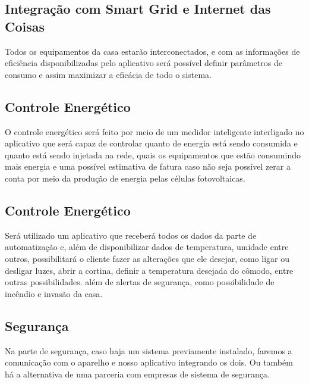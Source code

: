  	        \subsection{Integração com Smart Grid e Internet das Coisas}
 	            \par Todos os equipamentos da casa estarão interconectados, e com as informações de eficiência disponibilizadas pelo aplicativo será possível definir parâmetros de  consumo e assim maximizar a eficácia de todo o sistema.
 	            
 	        \subsection{Controle Energético}
	            \par O controle energético será feito por meio de um medidor inteligente interligado  no aplicativo que será capaz de controlar quanto de energia está sendo consumida e quanto está sendo injetada na rede, quais os equipamentos que estão consumindo mais energia e uma possível estimativa de fatura caso não seja possível zerar a conta por meio da produção de energia pelas células fotovoltaicas. \cite{solarvolt}
	            
	       \subsection{Controle Energético}
	            \par Será utilizado um aplicativo que receberá todos os dados da parte de automatização e, além de disponibilizar dados de temperatura, umidade entre outros, possibilitará o cliente fazer as alterações que ele desejar, como ligar ou desligar luzes, abrir a cortina, definir a temperatura desejada do cômodo, entre outras possibilidades. além de alertas de segurança, como possibilidade de incêndio e invasão da casa.  
	       
	       \subsection{Segurança}
	            \par Na parte de segurança, caso haja um sistema previamente instalado, faremos a comunicação com o aparelho e nosso aplicativo integrando os dois. Ou também há a alternativa de uma parceria com empresas de sistema de segurança.
	            
